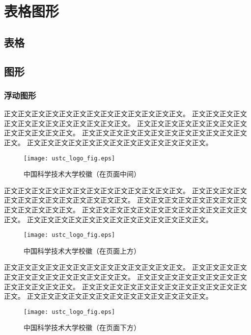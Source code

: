 ﻿
\chapter{表格图形}
\label{chap:tabfig}

\section{表格}


\section{图形}

\subsection{浮动图形}

正文正文正文正文正文正文正文正文正文正文正文正文正文。
正文正文正文正文正文正文正文正文正文正文正文正文正文。
正文正文正文正文正文正文正文正文正文正文正文正文正文。
正文正文正文正文正文正文正文正文正文正文正文正文正文。
正文正文正文正文正文正文正文正文正文正文正文正文正文。

\begin{figure}[h]
 \centering
 \texttt{[image: ustc\_logo\_fig.eps]}
 \caption{中国科学技术大学校徽（在页面中间）} 
 \label{fig:amss1}
\end{figure}

正文正文正文正文正文正文正文正文正文正文正文正文正文。
正文正文正文正文正文正文正文正文正文正文正文正文正文。
正文正文正文正文正文正文正文正文正文正文正文正文正文。
正文正文正文正文正文正文正文正文正文正文正文正文正文。
正文正文正文正文正文正文正文正文正文正文正文正文正文。

\begin{figure}[t]
 \centering
 \texttt{[image: ustc\_logo\_fig.eps]}
 \caption{中国科学技术大学校徽（在页面上方）}
 \label{fig:amss2}
\end{figure}

正文正文正文正文正文正文正文正文正文正文正文正文正文。
正文正文正文正文正文正文正文正文正文正文正文正文正文。
正文正文正文正文正文正文正文正文正文正文正文正文正文。
正文正文正文正文正文正文正文正文正文正文正文正文正文。
正文正文正文正文正文正文正文正文正文正文正文正文正文。

\begin{figure}[b]
 \centering
 \texttt{[image: ustc\_logo\_fig.eps]}
 \caption{中国科学技术大学校徽（在页面下方）}
 \label{fig:amss3}
\end{figure}


